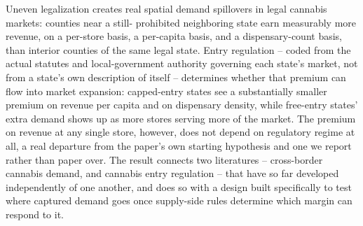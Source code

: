\documentclass[12pt]{article}
\begin{document}
Uneven legalization creates real spatial demand spillovers in legal cannabis markets: counties near a still-
prohibited neighboring state earn measurably more revenue, on a per-store basis, a per-capita basis, and a
dispensary-count basis, than interior counties of the same legal state. Entry regulation -- coded from the
actual statutes and local-government authority governing each state's market, not from a state's own
description of itself -- determines whether that premium can flow into market expansion: capped-entry states
see a substantially smaller premium on revenue per capita and on dispensary density, while free-entry states'
extra demand shows up as more stores serving more of the market. The premium on revenue at any single store,
however, does not depend on regulatory regime at all, a real departure from the paper's own starting
hypothesis and one we report rather than paper over. The result connects two literatures -- cross-border
cannabis demand, and cannabis entry regulation -- that have so far developed independently of one another, and
does so with a design built specifically to test where captured demand goes once supply-side rules determine
which margin can respond to it.



\end{document}
